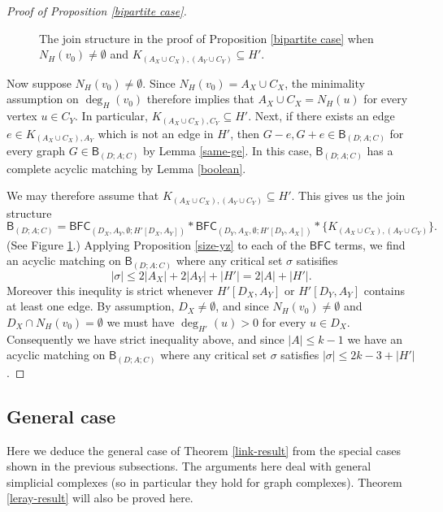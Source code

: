\documentclass[10pt]{amsart}
\theoremstyle{definition}
\begin{document}
\begin{proof}[Proof of Proposition \ref{bipartite case}]
\begin{figure}
			\caption{The join structure in the proof of Proposition \ref{bipartite case} when $N_H(v_0)\ne \emptyset$ and $K_{(A_X \cup C_X), (A_Y\cup C_Y)}\subseteq H'$.}
			\label{fig_section4.2}
		\end{figure}
		
		
		Now suppose $N_H(v_0) \neq \emptyset$. Since $N_H(v_0) = A_X\cup C_X$, the minimality assumption on $\deg_H(v_0)$ therefore implies that $A_X\cup C_X = N_H(u)$ for every vertex $u\in C_Y$. In particular, $K_{(A_X\cup C_X), C_Y}\subseteq H'$. Next, if there exists an edge $e\in K_{(A_X\cup C_X), A_Y}$ which is not an edge in $H'$, then $G-e, G+e \in \mathsf{B}_{(D;A;C)}$ for every graph $G\in \mathsf{B}_{(D;A;C)}$ by Lemma \ref{same-ge}. In this case, $\mathsf{B}_{(D;A;C)}$ has a complete acyclic matching by Lemma \ref{boolean}.
		
		We may therefore assume that $K_{(A_X\cup C_X), (A_Y\cup C_Y)} \subseteq H'$. This gives us the join structure 
		\[\mathsf{B}_{(D;A;C)} = \mathsf{BFC}_{(D_X, A_Y, \emptyset; H'[D_X, A_Y])} * \mathsf{BFC}_{(D_Y, A_X, \emptyset; H'[D_Y, A_X])} * \{ K_{(A_X\cup C_X), (A_Y\cup C_Y)}\}. \]
		(See Figure \ref{fig_section4.2}.) Applying Proposition \ref{size-yz} to each of the $\mathsf{BFC}$ terms, we find an acyclic matching on $\mathsf{B}_{(D;A:C)}$ where any critical set $\sigma$ satisifies 
		\[|\sigma| \leq 2|A_X| + 2|A_Y| + |H'|= 2|A| + |H'|.\]
		Moreover this inequlity is strict whenever $H'[D_X,A_Y]$ or $H'[D_Y, A_Y]$ contains at least one edge. By assumption, $D_X\neq \emptyset$, and since $N_H(v_0)\neq \emptyset$ and $D_X\cap N_H(v_0)=\emptyset$
		we must have $\deg_{H'}(u)>0$ for every $u\in D_X$. Consequently we have strict inequality above, and since $|A|\leq k-1$ we have an acyclic matching on $\mathsf{B}_{(D;A;C)}$ where any critical set $\sigma$ satisfies $|\sigma|\leq 2k-3 + |H'|$. 
	\end{proof}
	
	
	
	
	
	\subsection{General case} \label{homology}
	Here we deduce the general case of Theorem \ref{link-result} from the special cases shown in the previous subsections. The arguments here deal with general simplicial complexes (so in particular they hold for graph complexes). Theorem \ref{leray-result} will also be proved here.
	
\end{document}

